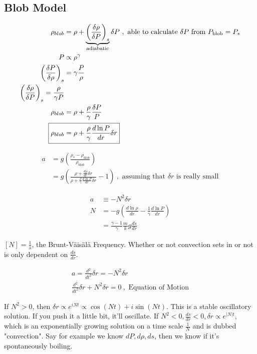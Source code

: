 \documentclass[10pt,letterpaper,final]{book}
\newcommand{\pt}{\propto}
\newcommand{\rp}{\right)}
\newcommand{\lp}{\left(}
\begin{document}
\subsection{Blob Model}

\begin{align}
\rho_{blob} &= \rho + \underbrace{\lp \frac{\delta \rho}{\delta P} \rp_s}_{\text{adiabatic}} \delta P~, \text{ able to calculate $\delta P$ from $P_{\text{blob}} = P_*$}\\
P &\pt \rho^\gamma\\
\lp \frac{\delta P}{\delta \rho} \rp_s &= \gamma \frac{P}{\rho}\\
\lp \frac{\delta \rho}{\delta P}\rp_s = \frac{\rho}{\gamma P}\\
\rho_{blob} &= \rho + \frac{\rho}{\gamma}\frac{\delta P}{P}\\
\Aboxed{\rho_{blob} &= \rho + \frac{\rho}{\gamma} \frac{d \ln P}{dr} \delta r}
\end{align}

\begin{align}
a &= g  \lp \frac{\rho_* - \rho_{blob}}{\rho_{blob}} \rp\\
&= g \lp \frac{\rho + \frac{d\rho}{dr} \delta r}{\rho + \frac{\rho}{\gamma} \frac{d \ln P}{dr}\delta r} - 1 \rp~,\text{ assuming that $\delta r$ is really small}
\end{align}

\begin{align}
a &\equiv -N^2\delta r\\
N &= -g \lp \frac{d \ln \rho}{dr} - \frac{1}{\gamma} \frac{d \ln P}{dr} \rp\\
&= \frac{\gamma -1}{\gamma} \frac{m}{k}g \frac{ds}{dr}
\end{align}

$[N] = \frac{1}{s}$, the Brunt-V\"ais\"al\"a Frequency. Whether or not convection sets in or not is only dependent on $\frac{ds}{dr}$. 

\begin{align}
a = \frac{d^2}{dt^2}\delta r = -N^2 \delta r\\
\boxed{\frac{d^2}{dt^2}\delta r + N^2 \delta r = 0}~,\text{ Equation of Motion}
\end{align}

If $N^2 > 0$, then $\delta r \pt e^{iNt} \pt  \cos(Nt)  + i\sin(Nt)$. This is a stable oscillatory solution. If you push it a little bit, it'll oscillate. If $N^2 < 0, \frac{ds}{dr} < 0, \delta r \pt e^{|N|t}$, which is an exponentially growing solution on a time scale $\frac{1}{N}$ and is dubbed "convection". Say for example we know $dP, d\rho, ds$, then we know if it's spontaneously boiling.\\
\end{document}
